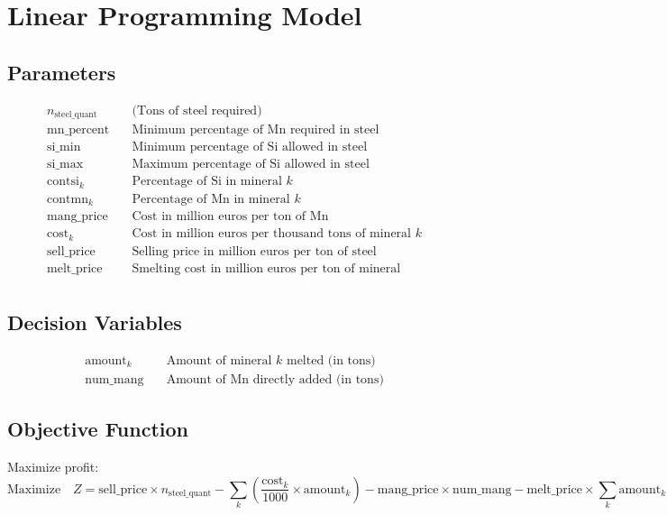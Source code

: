 \documentclass{article}
\begin{document}
\section*{Linear Programming Model}

\subsection*{Parameters}
\begin{align*}
    n_{\text{steel\_quant}} & \quad \text{(Tons of steel required)} \\
    \text{mn\_percent} & \quad \text{Minimum percentage of Mn required in steel} \\
    \text{si\_min} & \quad \text{Minimum percentage of Si allowed in steel} \\
    \text{si\_max} & \quad \text{Maximum percentage of Si allowed in steel} \\
    \text{contsi}_k & \quad \text{Percentage of Si in mineral $k$} \\
    \text{contmn}_k & \quad \text{Percentage of Mn in mineral $k$} \\
    \text{mang\_price} & \quad \text{Cost in million euros per ton of Mn} \\
    \text{cost}_k & \quad \text{Cost in million euros per thousand tons of mineral $k$} \\
    \text{sell\_price} & \quad \text{Selling price in million euros per ton of steel} \\
    \text{melt\_price} & \quad \text{Smelting cost in million euros per ton of mineral} \\
\end{align*}

\subsection*{Decision Variables}
\begin{align*}
    \text{amount}_k & \quad \text{Amount of mineral $k$ melted (in tons)} \\
    \text{num\_mang} & \quad \text{Amount of Mn directly added (in tons)}
\end{align*}

\subsection*{Objective Function}
Maximize profit:
\[
\text{Maximize} \quad Z = \text{sell\_price} \times n_{\text{steel\_quant}} - \sum_{k} \left( \frac{\text{cost}_k}{1000} \times \text{amount}_k \right) - \text{mang\_price} \times \text{num\_mang} - \text{melt\_price} \times \sum_k \text{amount}_k
\]
\end{document}
